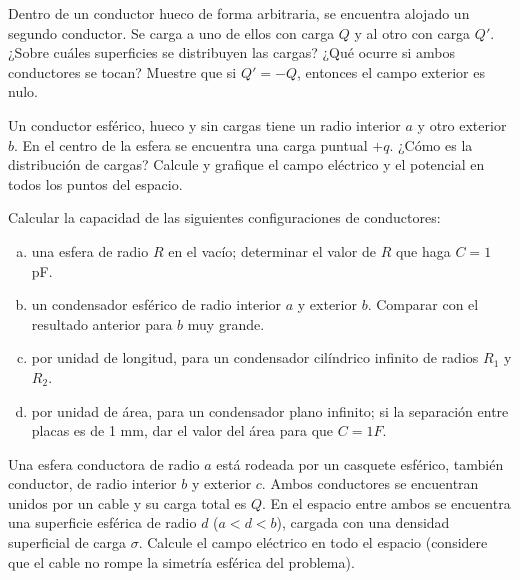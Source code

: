 \documentclass[problemas]{guia}
\begin{document}
 
\maketitle

\begin{problema}{}
    Dentro de un conductor hueco de forma arbitraria, se encuentra alojado un 
    segundo conductor. Se carga a uno de ellos con carga $Q$ y al otro con 
    carga $Q'$. ¿Sobre cuáles superficies se distribuyen las cargas?
    ¿Qué ocurre si ambos conductores se tocan?
    Muestre que si $Q' = -Q$, entonces el campo exterior es nulo.
\end{problema}

\begin{problema}{}
    Un conductor esférico, hueco y sin cargas tiene un radio interior $a$ y 
    otro exterior $b$. En el centro de la esfera se encuentra una carga puntual
    $+q$. ¿Cómo es la distribución de cargas? Calcule y grafique el campo  
    eléctrico y el potencial en todos los puntos del espacio.
\end{problema}

\begin{problema}{}
    Calcular la capacidad de las siguientes configuraciones de conductores:
    \begin{enumerate}[(a)]
        \item una esfera de radio $R$ en el vacío; determinar el valor de $R$ 
            que haga $C = 1$ pF.
        \item un condensador esférico de radio interior $a$ y exterior $b$. 
            Comparar con el resultado anterior para $b$ muy grande.
        \item por unidad de longitud, para un condensador cilíndrico infinito 
            de radios $R_1$ y $R_2$.
        \item por unidad de área, para un condensador plano infinito; si la 
            separación entre placas es de 1 mm, dar el valor del área para 
            que $C = 1 F$.
    \end{enumerate}
\end{problema}

\begin{problema}{}
    Una esfera conductora de radio $a$ está rodeada por un casquete esférico, 
    también conductor, de radio interior $b$ y exterior $c$. Ambos conductores
    se encuentran unidos por un cable y su carga total es $Q$. En el espacio 
    entre ambos se encuentra una superficie esférica de radio $d$ 
    ($a < d < b$), cargada con una densidad superficial de carga $\sigma$. 
    Calcule el campo eléctrico en todo el espacio (considere que el cable no 
    rompe la simetría esférica del problema).
\end{problema}
\end{document}
